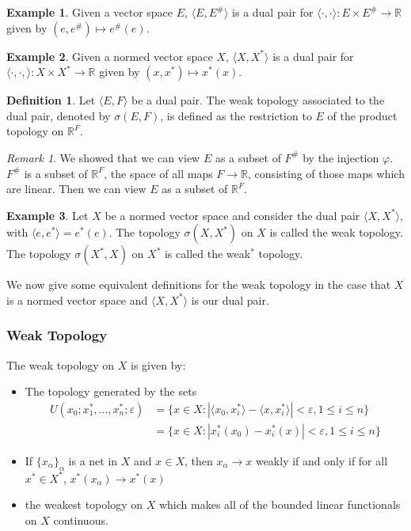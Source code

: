 \documentclass[12pt, reqno]{article}
\theoremstyle{plain}
\theoremstyle{definition}
\newtheorem*{definition}{Definition}
\newtheorem*{example}{Example}
\theoremstyle{remark}
\newtheorem*{remark}{Remark}
\renewcommand{\epsilon}{\varepsilon}
\newcommand{\RR}{\mathbb{R}}
\begin{document}
\begin{example}
    Given a vector space $E$, $\langle E, E^\# \rangle$ is a dual pair for $\langle \cdot, \cdot \rangle: 
    E\times E^\# \rightarrow \RR$ given by $(e, e^\#) \mapsto e^\#(e)$.
\end{example}

\begin{example}
    Given a normed vector space $X$, $\langle X, X^*\rangle$ is a dual pair for $\langle \cdot, \cdot, \rangle: 
    X\times X^* \rightarrow \RR$ given by $(x,x^*) \mapsto x^*(x)$.
\end{example}

\begin{definition}
    Let $\langle E,F\rangle$ be a dual pair. The weak topology associated to the dual pair, denoted by $\sigma(E,F)$, is 
    defined as the restriction to $E$ of the product topology on $\RR^F$. 
\end{definition}

\begin{remark}
    We showed that we can view $E$ as a subset of $F^\#$ by the injection $\varphi$. $F^\#$ is a subset of $\RR^F$, the space
    of all maps $F \rightarrow \RR$, consisting of those maps which are linear. Then we can view $E$ as a subset of $\RR^F$. 
\end{remark}

\begin{example}
    Let $X$ be a normed vector space and consider the dual pair $\langle X, X^*\rangle$, with $\langle e, e^*\rangle = e^*(e)$.
    The topology $\sigma(X,X^*)$ on $X$ is called the weak topology. The topology $\sigma(X^*, X)$ on $X^*$ is called
    the weak$^*$ topology. 
\end{example}

We now give some equivalent definitions for the weak topology in the case that $X$ is a normed vector space
and $\langle X, X^*\rangle$ is our dual pair. 

\subsubsection*{Weak Topology} 

The weak topology on $X$ is given by: 
\begin{itemize}
    \item The topology generated by the sets 
    \begin{align*}
    U(x_0; x_1^*, \dots, x_n^*; \epsilon) &= \{x \in X: |\langle x_0, x_i^*\rangle - \langle x, x_i^*\rangle| < \epsilon, 1 \leq i \leq n\}\\
    & = \{x \in X: |x_i^*(x_0) - x_i^*(x)| < \epsilon, 1 \leq i \leq n\}
    \end{align*}
    
    \item If $\{x_\alpha\}_{\alpha}$ is a net in $X$ and $x \in X$, then $x_\alpha \rightarrow x$ weakly if and only if 
    for all $x^* \in X^*$, $x^*(x_\alpha) \rightarrow x^*(x)$

    \item the weakest topology on $X$ which makes all of the bounded linear functionals on $X$ continuous.
\end{itemize}
\end{document}
